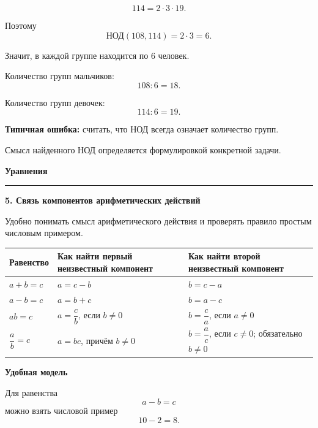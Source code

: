 \documentclass[a4paper,12pt]{article}
\newcommand{\sectiontitle}[1]{%
    \vspace{0.4em}
    {\Large\bfseries\textcolor{darkaccent}{#1}}\par
    \vspace{0.2em}
    \noindent
    \textcolor{accent}{\rule{\linewidth}{0.7pt}}\par
    \vspace{0.35em}
}
\newcommand{\subhead}[1]{%
    \vspace{0.25em}
    {\large\bfseries\textcolor{darkaccent}{#1}}\par
    \vspace{0.1em}
}
\begin{document}
\[
114=2\cdot3\cdot19.
\]

Поэтому
\[
\text{НОД}(108,114)=2\cdot3=6.
\]

Значит, в каждой группе находится
по $6$ человек.

Количество групп мальчиков:
\[
108:6=18.
\]

Количество групп девочек:
\[
114:6=19.
\]

\textbf{Типичная ошибка:}
считать, что НОД всегда означает количество групп.

Смысл найденного НОД определяется
формулировкой конкретной задачи.



\sectiontitle{Уравнения}

\subhead{5. Связь компонентов арифметических действий}

Удобно понимать смысл арифметического действия
и проверять правило простым числовым примером.

\begin{table}[ht]

\centering

\begin{tabularx}{\linewidth}{
    @{}
    >{\bfseries}l
    X
    X
    @{}
}

\toprule

Равенство
&
Как найти первый неизвестный компонент
&
Как найти второй неизвестный компонент
\\

\midrule

$a+b=c$
&
$a=c-b$
&
$b=c-a$
\\

$a-b=c$
&
$a=b+c$
&
$b=a-c$
\\

$ab=c$
&
$a=\dfrac{c}{b}$,
если $b\ne0$
&
$b=\dfrac{c}{a}$,
если $a\ne0$
\\

$\dfrac{a}{b}=c$
&
$a=bc$,
причём $b\ne0$
&
$b=\dfrac{a}{c}$,
если $c\ne0$;
обязательно $b\ne0$
\\

\bottomrule

\end{tabularx}

\end{table}

\textbf{Удобная модель}

Для равенства
\[
a-b=c
\]
можно взять числовой пример
\[
10-2=8.
\]
\end{document}
